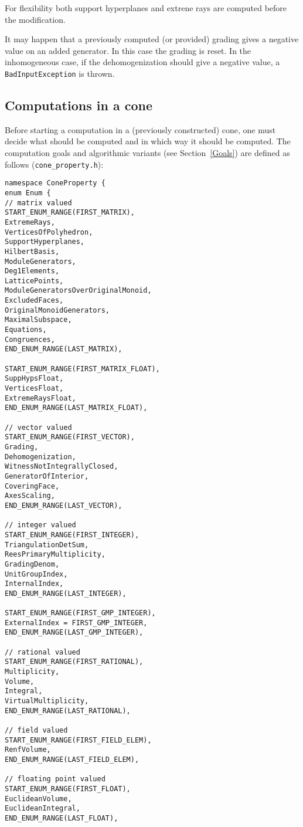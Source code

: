 \begin{small}
For flexibility both support hyperplanes and extrene rays are computed before the modification.

It may happen that a previously computed (or provided) grading gives a negative value on an added generator. In this case the grading is reset. In the inhomogeneous case, if the dehomogenization should give a negative value, a \verb|BadInputException| is thrown.

\subsection{Computations in a cone}

Before starting a computation in a (previously constructed) cone, one must decide what should be computed and in which way it should be computed. The computation goals and algorithmic variants (see Section~\ref{Goals}) are defined as follows (\verb|cone_property.h|):
\begin{Verbatim}
namespace ConeProperty {
enum Enum {
// matrix valued
START_ENUM_RANGE(FIRST_MATRIX),
ExtremeRays,
VerticesOfPolyhedron,
SupportHyperplanes,
HilbertBasis,
ModuleGenerators,
Deg1Elements,
LatticePoints,
ModuleGeneratorsOverOriginalMonoid,
ExcludedFaces,
OriginalMonoidGenerators,
MaximalSubspace,
Equations,
Congruences,
END_ENUM_RANGE(LAST_MATRIX),

START_ENUM_RANGE(FIRST_MATRIX_FLOAT),
SuppHypsFloat,
VerticesFloat,
ExtremeRaysFloat,
END_ENUM_RANGE(LAST_MATRIX_FLOAT),

// vector valued
START_ENUM_RANGE(FIRST_VECTOR),
Grading,
Dehomogenization,
WitnessNotIntegrallyClosed,
GeneratorOfInterior,
CoveringFace,
AxesScaling,
END_ENUM_RANGE(LAST_VECTOR),

// integer valued
START_ENUM_RANGE(FIRST_INTEGER),
TriangulationDetSum,
ReesPrimaryMultiplicity,
GradingDenom,
UnitGroupIndex,
InternalIndex,
END_ENUM_RANGE(LAST_INTEGER),

START_ENUM_RANGE(FIRST_GMP_INTEGER),
ExternalIndex = FIRST_GMP_INTEGER,
END_ENUM_RANGE(LAST_GMP_INTEGER),

// rational valued
START_ENUM_RANGE(FIRST_RATIONAL),
Multiplicity,
Volume,
Integral,
VirtualMultiplicity,
END_ENUM_RANGE(LAST_RATIONAL),

// field valued
START_ENUM_RANGE(FIRST_FIELD_ELEM),
RenfVolume,
END_ENUM_RANGE(LAST_FIELD_ELEM),

// floating point valued
START_ENUM_RANGE(FIRST_FLOAT),
EuclideanVolume,
EuclideanIntegral,
END_ENUM_RANGE(LAST_FLOAT),


\end{Verbatim}
\end{small}
